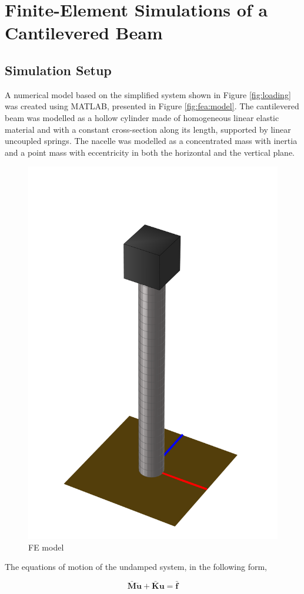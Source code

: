 \documentclass{article}
\begin{document}
\clearpage

\section{Finite-Element Simulations of a Cantilevered Beam}
\label{sec:simulations}

\subsection{Simulation Setup}

A numerical model based on the simplified system shown in Figure \autoref{fig:loading} was created using MATLAB, presented in Figure \autoref{fig:fea:model}. The cantilevered beam was modelled as a hollow cylinder made of  homogeneous linear elastic material and with a constant cross-section along its length, supported by linear uncoupled springs. The nacelle was modelled as a concentrated mass with inertia and a point mass with eccentricity in both the horizontal and the vertical plane.

\begin{figure}[ht]
    \centering
    \includegraphics[width=0.5\linewidth]{figures/FEModel.png}
    \caption{FE model}
    \label{fig:fea:model}
\end{figure}

The equations of motion of the undamped system, in the following form,

\begin{equation}
    \mathbf{\bar{M}}\ddot{\mathbf{u}}+\mathbf{\bar{K}}\mathbf{u} = \mathbf{\bar{f}}
    \label{eq:fea:system}
\end{equation}
\end{document}
